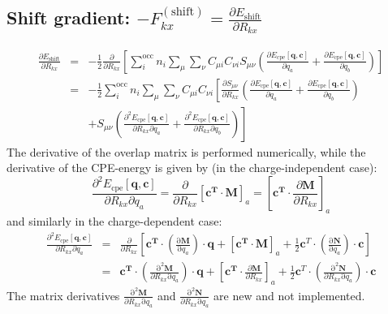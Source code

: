 \documentclass{article}
\numberwithin{equation}{section}
\begin{document}
\subsection{Shift gradient: $-F_{kx}^\mathrm{(shift)} = \frac{\partial E_\mathrm{shift}}{\partial R_{kx}}$}
\begin{eqnarray}
    \frac{\partial E_\mathrm{shift}}{\partial R_{kx}} &=& - \frac{1}{2} \frac{\partial }{\partial R_{kx}}\left[ \sum_i^\mathrm{occ} n_i \sum_{\mu} \sum_{\nu}  C_{\mu i} C_{\nu i} S_{\mu\nu} \left(
    \frac{\partial E_{\mathrm{cpe}}\left[\mathbf{q}, \mathbf{c}\right]}{\partial q_a} +
    \frac{\partial E_{\mathrm{cpe}}\left[\mathbf{q}, \mathbf{c}\right]}{\partial q_b}
\right)\right]\nonumber\\
&=& - \frac{1}{2} \sum_i^\mathrm{occ} n_i \sum_{\mu} \sum_{\nu}  C_{\mu i} C_{\nu i} \left[ \frac{\partial S_{\mu\nu}}{\partial R_{kx}}\left( 
    \frac{\partial E_{\mathrm{cpe}}\left[\mathbf{q}, \mathbf{c}\right]}{\partial q_a} +
    \frac{\partial E_{\mathrm{cpe}}\left[\mathbf{q}, \mathbf{c}\right]}{\partial q_b}
\right) \right. \nonumber\\
&& \left.+ S_{\mu\nu} \left(
    \frac{\partial^2 E_{\mathrm{cpe}}\left[\mathbf{q}, \mathbf{c}\right]}{\partial R_{kx}\partial q_a} +
    \frac{\partial^2 E_{\mathrm{cpe}}\left[\mathbf{q}, \mathbf{c}\right]}{\partial R_{kx} \partial q_b}
\right) \right]
\end{eqnarray}
The derivative of the overlap matrix is performed numerically, while the derivative of the CPE-energy is given by (in the charge-independent case):
\begin{equation}
    \frac{\partial^2 E_{\mathrm{cpe}}\left[\mathbf{q}, \mathbf{c}\right]}{\partial R_{kx}\partial q_a} = \frac{\partial}{\partial R_{kx}}\left[\mathbf{c^T} \cdot \mathbf{M}\right]_a = \left[\mathbf{c^T}  \cdot \frac{\partial \mathbf{M}}{\partial R_{kx}} \right]_a
\end{equation}
and similarly in the charge-dependent case:
\begin{eqnarray}
    \frac{\partial^2 E_{\mathrm{cpe}}\left[\mathbf{q}, \mathbf{c}\right]}{\partial R_{kx}\partial q_a} &=& \frac{\partial }{\partial R_{kx}} \left[
    \mathbf{c^T} \cdot \left( \frac{\mathrm{\partial}\mathbf{M}}{\mathrm{\partial}q_a}\right) \cdot \mathbf{q} 
    + [\mathbf{c^T}  \cdot \mathbf{M}]_a + 
\frac{1}{2}\mathbf{c}^T \cdot \left( \frac{\mathrm{\partial}\mathbf{N}}{\mathrm{\partial}q_a}\right) \cdot \mathbf{c} \right] \nonumber\\
&=& \mathbf{c^T} \cdot \left( \frac{\mathrm{\partial^2}\mathbf{M}}{\partial R_{kx}\mathrm{\partial}q_a}\right) \cdot \mathbf{q} 
+ \left[\mathbf{c^T}  \cdot \frac{\partial \mathbf{M}}{\partial R_{kx}} \right]_a
+\frac{1}{2}\mathbf{c}^T \cdot \left( \frac{\mathrm{\partial}^2\mathbf{N}}{\partial R_{kx}\mathrm{\partial}q_a}\right) \cdot \mathbf{c}
\end{eqnarray}
The matrix derivatives $\frac{\mathrm{\partial}^2\mathbf{M}}{\partial R_{kx}\mathrm{\partial}q_a}$ and $\frac{\mathrm{\partial}^2\mathbf{N}}{\partial R_{kx}\mathrm{\partial}q_a}$ are new and not implemented.
\end{document}
